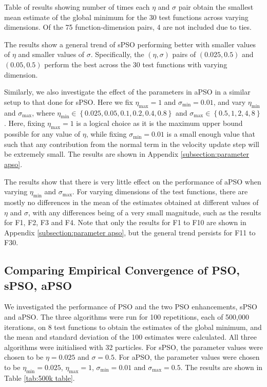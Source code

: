 \documentclass[12pt]{article}
\theoremstyle{definition}
\begin{document}
\begin{table}[H]
    \centering
    \renewcommand{\arraystretch}{0.7}
    
    \renewcommand{\arraystretch}{1}
    \caption{Table of results showing number of times each $\eta$ and $\sigma$ pair obtain the smallest mean estimate of the global minimum for the 30 test functions across varying dimensions. Of the 75 function-dimension pairs, 4 are not included due to ties.}
    \label{tab:spso winners table}
\end{table}

The results show a general trend of sPSO performing better with smaller values of $\eta$ and smaller values of $\sigma$. Specifically, the $(\eta, \sigma)$ pairs of $(0.025, 0.5)$ and $(0.05, 0.5)$ perform the best across the 30 test functions with varying dimension. \newline

Similarly, we also investigate the effect of the parameters in aPSO in a similar setup to that done for sPSO. Here we fix $\eta_\text{max} = 1$ and $\sigma_\text{min} = 0.01$, and vary $\eta_\text{min}$ and $\sigma_\text{max}$, where $\eta_\text{min} \in \left\{ 0.025, 0.05, 0.1, 0.2, 0.4, 0.8 \right\}$ and $\sigma_\text{max} \in \left\{ 0.5, 1, 2, 4, 8 \right\}$. Here, fixing $\eta_\text{max} = 1$ is a logical choice as it is the maximum upper bound possible for any value of $\eta$, while fixing $\sigma_\text{min} = 0.01$ is a small enough value that such that any contribution from the normal term in the velocity update step will be extremely small. The results are shown in Appendix \ref{subsection:parameter apso}. \newline

The results show that there is very little effect on the performance of aPSO when varying $\eta_\text{min}$ and $\sigma_\text{max}$. For varying dimensions of the test functions, there are mostly no differences in the mean of the estimates obtained at different values of $\eta$ and $\sigma$, with any differences being of a very small magnitude, such as the results for F1, F2, F3 and F4. Note that only the results for F1 to F10 are shown in Appendix \ref{subsection:parameter apso}, but the general trend persists for F11 to F30.

\subsection{Comparing Empirical Convergence of PSO, sPSO, aPSO}
\label{subsection:empirical convergence}
We investigated the performance of PSO and the two PSO enhancements, sPSO and aPSO. The three algorithms were run for 100 repetitions, each of 500,000 iterations, on 8 test functions to obtain the estimates of the global minimum, and the mean and standard deviation of the 100 estimates were calculated. All three algorithms were initialised with 32 particles. For sPSO, the parameter values were chosen to be $\eta = 0.025$ and $\sigma = 0.5$. For aPSO, the parameter values were chosen to be $\eta_\text{min} = 0.025$, $\eta_\text{max} = 1$, $\sigma_\text{min} = 0.01$ and $\sigma_\text{max} = 0.5$. The results are shown in Table \ref{tab:500k table}.
\end{document}
